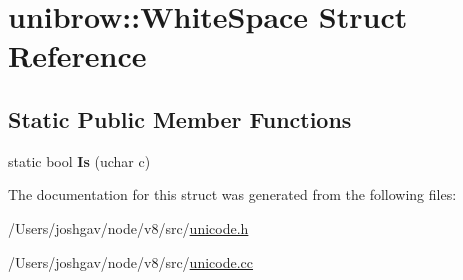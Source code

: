 \hypertarget{structunibrow_1_1_white_space}{}\section{unibrow\+:\+:White\+Space Struct Reference}
\label{structunibrow_1_1_white_space}
\subsection*{Static Public Member Functions}
\begin{DoxyCompactItemize}
\item 
static bool {\bfseries Is} (uchar c)\hypertarget{structunibrow_1_1_white_space_a1bb2745e2cd1b5d6d59c5527a70f55b5}{}\label{structunibrow_1_1_white_space_a1bb2745e2cd1b5d6d59c5527a70f55b5}

\end{DoxyCompactItemize}


The documentation for this struct was generated from the following files\+:\begin{DoxyCompactItemize}
\item 
/\+Users/joshgav/node/v8/src/\hyperlink{unicode_8h}{unicode.\+h}\item 
/\+Users/joshgav/node/v8/src/\hyperlink{unicode_8cc}{unicode.\+cc}\end{DoxyCompactItemize}
